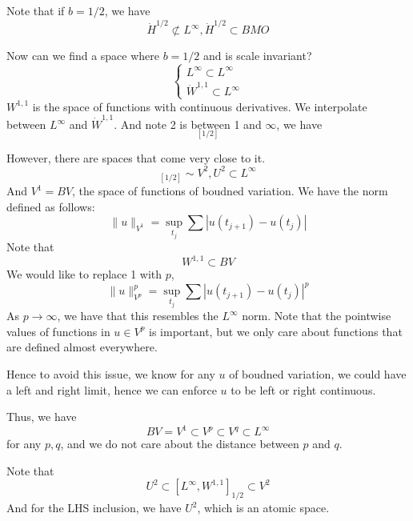 Note that if $b=1/2$, we have
\begin{equation*}
    \dot{H}^{1/2}\not\subset L^\infty, \dot{H}^{1/2}\subset BMO
\end{equation*}

Now can we find a space where $b=1/2$ and is scale invariant?
\begin{equation*}
    \begin{cases}
        L^\infty\subset L^\infty\\
        \dot{W}^{1,1}\subset L^\infty
    \end{cases}
\end{equation*}
$W^{1,1}$ is the space of functions with continuous derivatives. We interpolate between $L^\infty$ and $\dot{W}^{1,1}$. And note 2 is between 1 and $\infty$, we have
\begin{equation*}
    [L^\infty, \dot{W}^{1,1}]_{[1/2]}
\end{equation*}

However, there are spaces that come very close to it.
\begin{equation*}
    []_{[1/2]}\sim V^2, U^2\subset L^\infty
\end{equation*}
And $V^1=BV$, the space of functions of boudned variation. 
We have the norm defined as follows:
\begin{equation*}
    \|u\|_{V^1}=\sup_{t_j}\sum|u(t_{j+1})-u(t_j)|
\end{equation*}
Note that
\begin{equation*}
    W^{1,1}\subset BV
\end{equation*}
We would like to replace 1 with $p$,
\begin{equation*}
    \|u\|_{V^p}^p=\sup_{t_j}\sum|u(t_{j+1})-u(t_j)|^p
\end{equation*}
As $p\to\infty$, we have that this resembles the $L^\infty$ norm.
Note that the pointwise values of functions in $u\in V^p$ is important, but we only care about functions that are defined almost everywhere.

Hence to avoid this issue, we know for any $u$ of boudned variation, we could have a left and right limit, hence we can enforce $u$ to be left or right continuous.

Thus, we have
\begin{equation*}
    BV=V^1\subset V^p\subset V^q\subset L^\infty
\end{equation*}
for any $p,q$, and we do not care about the distance between $p$ and $q$.

Note that
\begin{equation*}
    U^2\subset [L^\infty, W^{1,1}]_{1/2}\subset V^2
\end{equation*}
And for the LHS inclusion, we have $U^2$, which is an atomic space.

